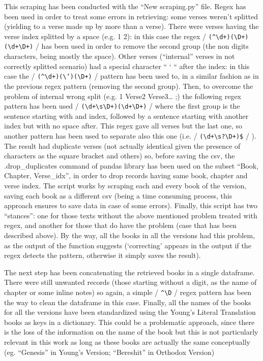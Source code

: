 \documentclass[sigchi]{article}
\begin{document}
This scraping has been conducted with the “New scraping.py” file. Regex has been used in order to treat some errors in retrieving: some verses weren’t splitted (yielding to a verse made up by more than a verse). There were verses having the verse index splitted by a space (e.g. 1 2): in this case the regex / \verb/(^\d+)(\D+)(\d+\D+)/ / has been used in order to remove the second group (the non digits characters, being mostly the space). Other verses (“internal” verses in not correctly splitted scenario) had a special character “ ‘ “  after the index: in this case the
 / \verb/(^\d+)(\‘)(\D+)/ / pattern has been used to, in a similar fashion as in the previous regex pattern (removing the second group). Then, to overcome the problem of internal wrong split (e.g. 1 Verse2 Verse3… ;) the following regex pattern has been used / \verb/(\d+\s\D+)(\d+\D+)/ / where the first group is the sentence starting with and index, followed by a sentence starting with another index but with no space after. This regex gave all verses but the last one, so another pattern has been used to separate also this one (i.e.  / \verb/(\d+\s?\D+)$/ / ).
The result had duplicate verses (not actually identical given the presence of characters as the square bracket and others) so, before saving the csv, the .drop\_duplicates command of pandas library has been used on the subset “Book, Chapter, Verse\_idx”, in order to drop records having same book, chapter and verse index. The script works by scraping each and every book of the version, saving each book as a different csv (being a time consuming process, this approach ensures to save data in case of some errors). Finally, this script has two “stances”: one for those texts without the above mentioned problem treated with regex, and another for those that do have the problem (case that has been described above). By the way, all the books in all the versions had this problem, as the output of the function suggests (‘correcting’ appears in the output if the regex detects the pattern, otherwise it simply saves the result).

The next step has been concatenating the retrieved books in a single dataframe. There were still unwanted records (those starting without a digit, as the name of chapter or some inline notes) so again, a simple / \verb/^\D/ / regex pattern has been the way to clean the dataframe in this case. Finally, all the names of the books for all the versions have been standardized using the Young’s Literal Translation books as keys in a dictionary. This could be a problematic approach, since there is the loss of the information on the name of the book but this is not particularly relevant in this work as long as these books are actually the same conceptually (eg. “Genesis” in Young’s Version; “Bereshit” in Orthodox Version)
\end{document}
